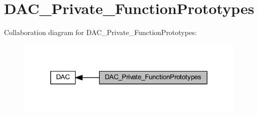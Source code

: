 \hypertarget{group___d_a_c___private___function_prototypes}{}\section{D\+A\+C\+\_\+\+Private\+\_\+\+Function\+Prototypes}
\label{group___d_a_c___private___function_prototypes}
Collaboration diagram for D\+A\+C\+\_\+\+Private\+\_\+\+Function\+Prototypes\+:
\nopagebreak
\begin{figure}[H]
\begin{center}
\leavevmode
\includegraphics[width=314pt]{group___d_a_c___private___function_prototypes}
\end{center}
\end{figure}
